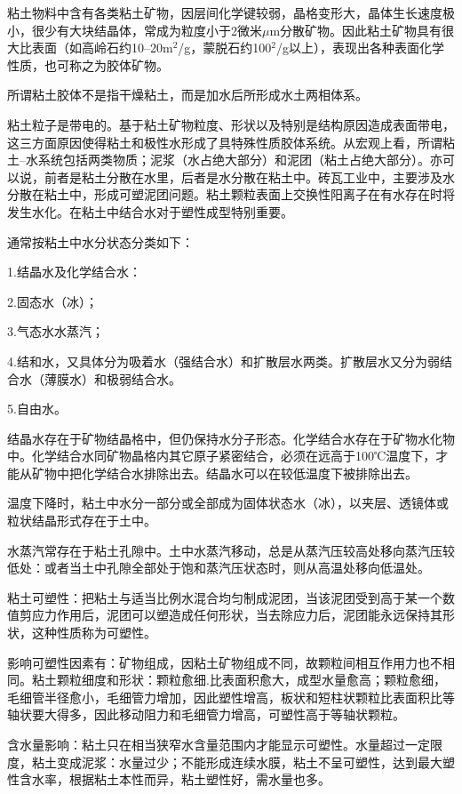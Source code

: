 \documentclass{ctexbook}
\begin{document}
粘土物料中含有各类粘土矿物，因层间化学键较弱，晶格变形大，晶体生长速度极小，很少有大块结晶体，常成为粒度小于2微米$\mu$m分散矿物。因此粘土矿物具有很大比表面（如高岭石约10--20m$^2$/g，蒙脱石约100$^2$/g以上），表现出各种表面化学性质，也可称之为胶体矿物。

所谓粘土胶体不是指干燥粘土，而是加水后所形成水土两相体系。

粘土粒子是带电的。基于粘土矿物粒度、形状以及特别是结构原因造成表面带电，这三方面原因使得粘土和极性水形成了具特殊性质胶体系统。从宏观上看，所谓粘土--水系统包括两类物质；泥浆（水占绝大部分）和泥团（粘土占绝大部分）。亦可以说，前者是粘土分散在水里，后者是水分散在粘土中。砖瓦工业中，主要涉及水分散在粘土中，形成可塑泥团问题。粘土颗粒表面上交换性阳离子在有水存在时将发生水化。在粘土中结合水对于塑性成型特别重要。

通常按粘土中水分状态分类如下：

1.结晶水及化学结合水：

2.固态水（冰）；

3.气态水水蒸汽；

4.结和水，又具体分为吸着水（强结合水）和扩散层水两类。扩散层水又分为弱结合水（薄膜水）和极弱结合水。

5.自由水。

结晶水存在于矿物结晶格中，但仍保持水分子形态。化学结合水存在于矿物水化物中。化学结合水同矿物晶格内其它原子紧密结合，必须在远高于100℃温度下，才能从矿物中把化学结合水排除出去。结晶水可以在较低温度下被排除出去。

温度下降时，粘土中水分一部分或全部成为固体状态水（冰），以夹层、透镜体或粒状结晶形式存在于土中。

水蒸汽常存在于粘土孔隙中。土中水蒸汽移动，总是从蒸汽压较高处移向蒸汽压较低处：或者当土中孔隙全部处于饱和蒸汽压状态时，则从高温处移向低温处。

粘土可塑性：把粘土与适当比例水混合均匀制成泥团，当该泥团受到高于某一个数值剪应力作用后，泥团可以塑造成任何形状，当去除应力后，泥团能永远保持其形状，这种性质称为可塑性。

影响可塑性因素有：矿物组成，因粘土矿物组成不同，故颗粒间相互作用力也不相同。粘土颗粒细度和形状：颗粒愈细.比表面积愈大，成型水量愈高；颗粒愈细，毛细管半径愈小，毛细管力增加，因此塑性增高，板状和短柱状颗粒比表面积比等轴状要大得多，因此移动阻力和毛细管力增高，可塑性高于等轴状颗粒。

含水量影响：粘土只在相当狭窄水含量范围内才能显示可塑性。水量超过一定限度，粘土变成泥浆：水量过少；不能形成连续水膜，粘土不呈可塑性，达到最大塑性含水率，根据粘土本性而异，粘土塑性好，需水量也多。
\end{document}
